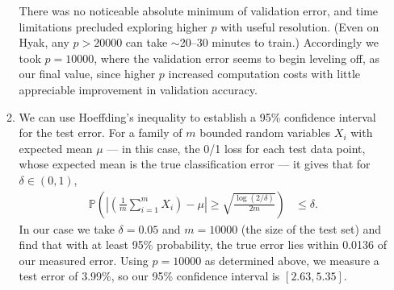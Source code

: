 \documentclass[11pt,letterpaper]{article}
\numberwithin{equation}{section}
\numberwithin{figure}{section}
\begin{document}
\begin{enumerate}[label=\arabic*.]
\begin{enumerate}
	There was no noticeable absolute minimum of validation error, and time limitations precluded exploring higher $p$ with useful resolution. (Even on Hyak, any $p > 20000$ can take $\sim$20--30 minutes to train.) Accordingly we took $p=10000$, where the validation error seems to begin leveling off, as our final value, since higher $p$ increased computation costs with little appreciable improvement in validation accuracy.



	\item We can use Hoeffding's inequality to establish a 95\% confidence interval for the test error. For a family of $m$ bounded random variables $X_i$ with expected mean $\mu$ --- in this case, the 0/1 loss for each test data point, whose expected mean is the true classification error --- it gives that for $\delta \in (0,1)$,
	\begin{align}
		\mathbb{P}\left(\left|\left(\frac{1}{m}\sum_{i=1}^m X_i\right) - \mu\right| \geq \sqrt{\frac{\log(2/\delta)}{2m}}\right) &\leq \delta.
	\end{align}
	In our case we take $\delta = 0.05$ and $m= 10000$ (the size of the test set) and find that with at least 95\% probability, the true error lies within 0.0136 of our measured error. Using $p=10000$ as determined above, we measure a test error of 3.99\%, so our 95\% confidence interval is $[2.63,5.35]$.
	\end{enumerate}
\end{enumerate}

\clearpage



\clearpage


\end{document}
